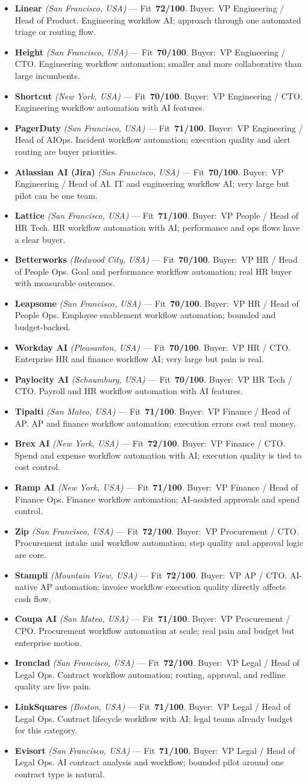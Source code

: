 \documentclass[10pt]{article}
\newcommand{\cand}[5]{\item \textbf{#1} \textit{(#2)} --- Fit~\textbf{#3/100}. Buyer:~#4. #5}
\begin{document}
\begin{itemize}
\cand{Linear}{San Francisco, USA}{72}{VP Engineering / Head of Product}{Engineering workflow AI; approach through one automated triage or routing flow.}
\cand{Height}{San Francisco, USA}{70}{VP Engineering / CTO}{Engineering workflow automation; smaller and more collaborative than large incumbents.}
\cand{Shortcut}{New York, USA}{70}{VP Engineering / CTO}{Engineering workflow automation with AI features.}
\cand{PagerDuty}{San Francisco, USA}{71}{VP Engineering / Head of AIOps}{Incident workflow automation; execution quality and alert routing are buyer priorities.}
\cand{Atlassian AI (Jira)}{San Francisco, USA}{70}{VP Engineering / Head of AI}{IT and engineering workflow AI; very large but pilot can be one team.}
\cand{Lattice}{San Francisco, USA}{71}{VP People / Head of HR Tech}{HR workflow automation with AI; performance and ops flows have a clear buyer.}
\cand{Betterworks}{Redwood City, USA}{70}{VP HR / Head of People Ops}{Goal and performance workflow automation; real HR buyer with measurable outcomes.}
\cand{Leapsome}{San Francisco, USA}{70}{VP HR / Head of People Ops}{Employee enablement workflow automation; bounded and budget-backed.}
\cand{Workday AI}{Pleasanton, USA}{70}{VP HR / CTO}{Enterprise HR and finance workflow AI; very large but pain is real.}
\cand{Paylocity AI}{Schaumburg, USA}{70}{VP HR Tech / CTO}{Payroll and HR workflow automation with AI features.}
\cand{Tipalti}{San Mateo, USA}{71}{VP Finance / Head of AP}{AP and finance workflow automation; execution errors cost real money.}
\cand{Brex AI}{New York, USA}{72}{VP Finance / CTO}{Spend and expense workflow automation with AI; execution quality is tied to cost control.}
\cand{Ramp AI}{New York, USA}{71}{VP Finance / Head of Finance Ops}{Finance workflow automation; AI-assisted approvals and spend control.}
\cand{Zip}{San Francisco, USA}{72}{VP Procurement / CTO}{Procurement intake and workflow automation; step quality and approval logic are core.}
\cand{Stampli}{Mountain View, USA}{72}{VP AP / CTO}{AI-native AP automation; invoice workflow execution quality directly affects cash flow.}
\cand{Coupa AI}{San Mateo, USA}{71}{VP Procurement / CPO}{Procurement workflow automation at scale; real pain and budget but enterprise motion.}
\cand{Ironclad}{San Francisco, USA}{72}{VP Legal / Head of Legal Ops}{Contract workflow automation; routing, approval, and redline quality are live pain.}
\cand{LinkSquares}{Boston, USA}{71}{VP Legal / Head of Legal Ops}{Contract lifecycle workflow with AI; legal teams already budget for this category.}
\cand{Evisort}{San Francisco, USA}{71}{VP Legal / Head of Legal Ops}{AI contract analysis and workflow; bounded pilot around one contract type is natural.}

\end{itemize}
\end{document}
